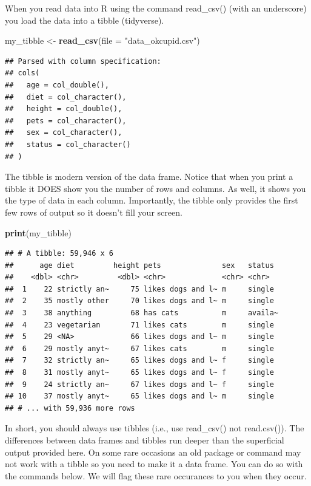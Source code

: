 \documentclass[
]{krantz}
\makeatletter
\newenvironment{Shaded}{\begin{snugshade}}{\end{snugshade}}
\newcommand{\DataTypeTok}[1]{\textcolor[rgb]{0.27,0.27,0.27}{#1}}
\newcommand{\KeywordTok}[1]{\textcolor[rgb]{0.27,0.27,0.27}{\textbf{#1}}}
\newcommand{\NormalTok}[1]{#1}
\newcommand{\StringTok}[1]{\textcolor[rgb]{0.5,0.5,0.5}{#1}}
\newenvironment{kframe}{%
\medskip{}
\setlength{\fboxsep}{.8em}
 \def\at@end@of@kframe{}%
 \ifinner\ifhmode%
  \def\at@end@of@kframe{\end{minipage}}%
  \begin{minipage}{\columnwidth}%
 \fi\fi%
 \def\FrameCommand##1{\hskip\@totalleftmargin \hskip-\fboxsep
 \colorbox{shadecolor}{##1}\hskip-\fboxsep
     \hskip-\linewidth \hskip-\@totalleftmargin \hskip\columnwidth}%
 \MakeFramed {\advance\hsize-\width
   \@totalleftmargin\z@ \linewidth\hsize
   \@setminipage}}%
 {\par\unskip\endMakeFramed%
 \at@end@of@kframe}
\renewenvironment{Shaded}{\begin{kframe}}{\end{kframe}}
\makeatother
\begin{document}
When you read data into R using the command read\_csv() (with an underscore) you load the data into a tibble (tidyverse).

\begin{Shaded}
\begin{Highlighting}[]
\NormalTok{my_tibble <-}\StringTok{ }\KeywordTok{read_csv}\NormalTok{(}\DataTypeTok{file =} \StringTok{"data_okcupid.csv"}\NormalTok{)}
\end{Highlighting}
\end{Shaded}

\begin{verbatim}
## Parsed with column specification:
## cols(
##   age = col_double(),
##   diet = col_character(),
##   height = col_double(),
##   pets = col_character(),
##   sex = col_character(),
##   status = col_character()
## )
\end{verbatim}

The tibble is modern version of the data frame. Notice that when you print a tibble it DOES show you the number of rows and columns. As well, it shows you the type of data in each column. Importantly, the tibble only provides the first few rows of output so it doesn't fill your screen.

\begin{Shaded}
\begin{Highlighting}[]
\KeywordTok{print}\NormalTok{(my_tibble)}
\end{Highlighting}
\end{Shaded}

\begin{verbatim}
## # A tibble: 59,946 x 6
##      age diet         height pets              sex   status 
##    <dbl> <chr>         <dbl> <chr>             <chr> <chr>  
##  1    22 strictly an~     75 likes dogs and l~ m     single 
##  2    35 mostly other     70 likes dogs and l~ m     single 
##  3    38 anything         68 has cats          m     availa~
##  4    23 vegetarian       71 likes cats        m     single 
##  5    29 <NA>             66 likes dogs and l~ m     single 
##  6    29 mostly anyt~     67 likes cats        m     single 
##  7    32 strictly an~     65 likes dogs and l~ f     single 
##  8    31 mostly anyt~     65 likes dogs and l~ f     single 
##  9    24 strictly an~     67 likes dogs and l~ f     single 
## 10    37 mostly anyt~     65 likes dogs and l~ m     single 
## # ... with 59,936 more rows
\end{verbatim}

In short, you should always use tibbles (i.e., use read\_csv() not read.csv()). The differences between data frames and tibbles run deeper than the superficial output provided here. On some rare occasions an old package or command may not work with a tibble so you need to make it a data frame. You can do so with the commands below. We will flag these rare occurances to you when they occur.
\end{document}
